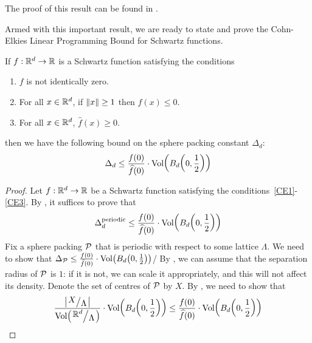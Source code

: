 The proof of this result can be found in \sorry{}. %

Armed with this important result, we are ready to state and prove the Cohn-Elkies Linear Programming Bound for Schwartz functions.

\begin{boxtheorem}\label{SP:Thm:CohnElkies} %
    If $f : \mathbb{R}^d \to \mathbb{R}$ is a Schwartz function satisfying the conditions
    \begin{enumerate}[label = \normalfont(CE\arabic*)]
        \item\label{CE1} $f$ is not identically zero.
        \item\label{CE2} For all $x \in \mathbb{R}^d$, if $\left\lVert x \right\rVert \geq 1$ then $f(x) \leq 0$.
        \item\label{CE3} For all $x \in \mathbb{R}^d$, $\hat{f}(x) \geq 0$.
    \end{enumerate}
    then we have the following bound on the sphere packing constant $\Delta_d$:
    \begin{align*}
        \Delta_d \leq \frac{f(0)}{\widehat{f}(0)} \cdot \operatorname{Vol}\!\left( B_d\!\left( 0, \frac{1}{2} \right) \right)
    \end{align*}
\end{boxtheorem}
\begin{proof}
    Let $f : \mathbb{R}^d \to \mathbb{R}$ be a Schwartz function satisfying the conditions~\ref{CE1}-\ref{CE3}. By , it suffices to prove that
    \begin{align*}
        \Delta_d^{\operatorname{periodic}} \leq \frac{f(0)}{\widehat{f}(0)} \cdot \operatorname{Vol}\!\left( B_d\!\left( 0, \frac{1}{2} \right) \right)
    \end{align*}
    Fix a sphere packing $\mathcal{P}$ that is periodic with respect to some lattice $\Lambda$. We need to show that $\Delta_{\mathcal{P}} \leq \frac{f(0)}{\widehat{f}(0)} \cdot \operatorname{Vol}\!\left( B_d\!\left( 0, \frac{1}{2} \right) \right)$/ By , we can assume that the separation radius of $\mathcal{P}$ is $1$: if it is not, we can scale it appropriately, and this will not affect its density. Denote the set of centres of $\mathcal{P}$ by $X$. By , we need to show that
    \begin{align*}
        \frac{\abs{\quotient{X}{\Lambda}}}{\Volof{\quotient{\R^d}{\Lambda}}} \cdot \Volof{B_d\of{0, \frac{1}{2}}} \leq \frac{f(0)}{\hat{f}(0)} \cdot \Volof{B_d\of{0, \frac{1}{2}}}
    \end{align*}
\end{proof}